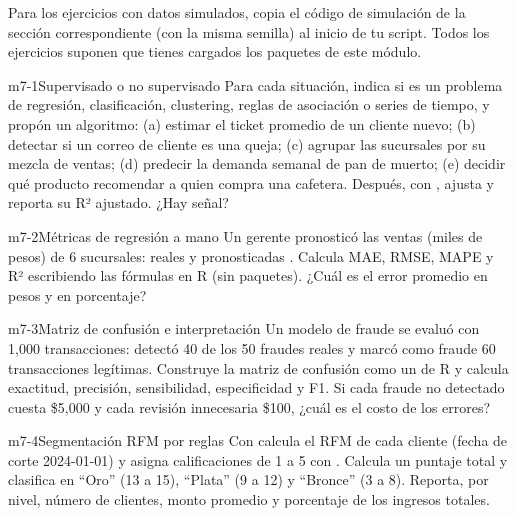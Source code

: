 Para los ejercicios con datos simulados, copia el código de simulación de la
sección correspondiente (con la misma semilla) al inicio de tu script. Todos
los ejercicios suponen que tienes cargados los paquetes de este módulo.

\begin{ejercicio}{m7-1}{Supervisado o no supervisado}
Para cada situación, indica si es un problema de regresión, clasificación,
clustering, reglas de asociación o series de tiempo, y propón un algoritmo:
(a) estimar el ticket promedio de un cliente nuevo; (b) detectar si un correo
de cliente es una queja; (c) agrupar las sucursales por su mezcla de ventas;
(d) predecir la demanda semanal de pan de muerto; (e) decidir qué producto
recomendar a quien compra una cafetera. Después, con
, ajusta 
y reporta su R² ajustado. ¿Hay señal?
\end{ejercicio}

\begin{ejercicio}{m7-2}{Métricas de regresión a mano}
Un gerente pronosticó las ventas (miles de pesos) de 6 sucursales:
reales  y pronosticadas
. Calcula MAE, RMSE, MAPE y R²
escribiendo las fórmulas en R (sin paquetes). ¿Cuál es el error promedio en
pesos y en porcentaje?
\end{ejercicio}

\begin{ejercicio}{m7-3}{Matriz de confusión e interpretación}
Un modelo de fraude se evaluó con 1{,}000 transacciones: detectó 40 de los 50
fraudes reales y marcó como fraude 60 transacciones legítimas. Construye la
matriz de confusión como un  de R y calcula exactitud,
precisión, sensibilidad, especificidad y F1. Si cada fraude no detectado
cuesta \$5{,}000 y cada revisión innecesaria \$100, ¿cuál es el costo de los
errores?
\end{ejercicio}

\begin{ejercicio}{m7-4}{Segmentación RFM por reglas}
Con  calcula el RFM de cada cliente (fecha de
corte 2024-01-01) y asigna calificaciones de 1 a 5 con .
Calcula un puntaje total  y clasifica en ``Oro'' (13 a 15),
``Plata'' (9 a 12) y ``Bronce'' (3 a 8). Reporta, por nivel, número de
clientes, monto promedio y porcentaje de los ingresos totales.
\end{ejercicio}

